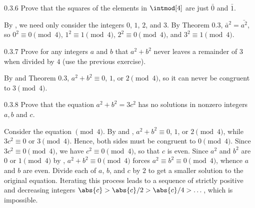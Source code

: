 \begin{exercise}{0.3.6}
    Prove that the squares of the elements in $\intmod[4]$ are just $\bar 0$ and $\bar 1$.
\end{exercise}

\begin{sol}
    By , we need only consider the integers $0$, $1$, $2$, and $3$.
    By Theorem 0.3, $\bar{a}^2 = \bar{a^2}$, so $0^2 \equiv 0 \pmod 4$, $1^2 \equiv 1 \pmod 4$, $2^2 \equiv 0 \pmod 4$, and $3^2 \equiv 1 \pmod 4$.
\end{sol}

\begin{exercise}{0.3.7}
    Prove for any integers $a$ and $b$ that $a^2 + b^2$ never leaves a remainder of $3$ when divided by $4$ (use the previous exercise).
\end{exercise}

\begin{sol}
    By  and Theorem 0.3, $a^2 + b^2 \equiv 0$, $1$, or $2 \pmod 4$, so it can never be congruent to $3 \pmod 4$.
\end{sol}

\begin{exercise}{0.3.8}
    Prove that the equation $a^2 + b^2 = 3c^2$ has no solutions in nonzero integers $a, b$ and $c$.
\end{exercise}

\begin{sol}
    Consider the equation $\pmod 4$.
    By  and , $a^2 + b^2 \equiv 0$, $1$, or $2 \pmod 4$, while $3c^2 \equiv 0$ or $3 \pmod 4$.
    Hence, both sides must be congruent to $0 \pmod 4$.
    Since $3c^2 \equiv 0 \pmod 4$, we have $c^2 \equiv 0 \pmod 4$, so that $c$ is even.
    Since $a^2$ and $b^2$ are $0$ or $1 \pmod 4$ by , $a^2 + b^2 \equiv 0 \pmod 4$ forces $a^2 \equiv b^2 \equiv 0 \pmod 4$, whence $a$ and $b$ are even.
    Divide each of $a$, $b$, and $c$ by $2$ to get a smaller solution to the original equation.
    Iterating this process leads to a sequence of strictly positive and decreasing integers $\abs{c} > \abs{c}/2 > \abs{c}/4 > \dots$, which is impossible.
\end{sol}

